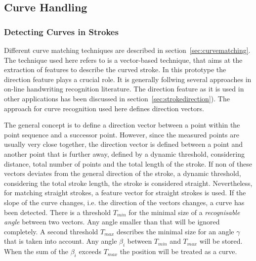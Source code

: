 \subsection{Curve Handling}
\label{sec:hwre:curvehandling}

\subsubsection{Detecting Curves in Strokes}
\label{sec:hwre:detectingcurvesinstrokes}

Different curve matching techniques are described in 
section~\ref{sec:curvematching}. The technique used here refers to is a 
vector-based technique, that aims at the extraction of features to describe
the curved stroke. In this prototype the direction feature plays a crucial role.
It is generally follwing several approaches in on-line handwriting recognition
literature. The direction feature as it is used in other applications has been
discussed in section~\ref{sec:strokedirection}). The approach for curve
recognition used here defines direction vectors.

The general concept is to define a direction vector between a point
within the point sequence and a successor point.
However, since the measured points are usually very close together, 
the direction vector is defined between a point and another point that 
is further away, defined by a dynamic threshold, considering distance,
total number of points and the total length of the stroke.
If non of these vectors deviates from the general direction of the stroke,
a dynamic threshold, considering the total stroke length,
the stroke is considered straight. Nevertheless, for matching straight strokes,
a feature vector for straight strokes is used.
If the slope of the curve changes, i.e. the direction of the vectors changes, 
a curve has been detected. 
There is a threshold \( T_{min} \) for the minimal size of a 
\emph{recognisable angle} between two vectors. Any angle smaller than that will 
be ignored completely. A second threshold \( T_{max} \) describes the minimal size
for an angle \( \gamma \)  that is taken into account.
Any angle \( \beta_{i} \) between \( T_{min} \) and \( T_{max} \) will be stored. 
When the sum of the \( \beta_{i} \) exceeds \( T_{max} \) the position will be 
treated as a curve.

